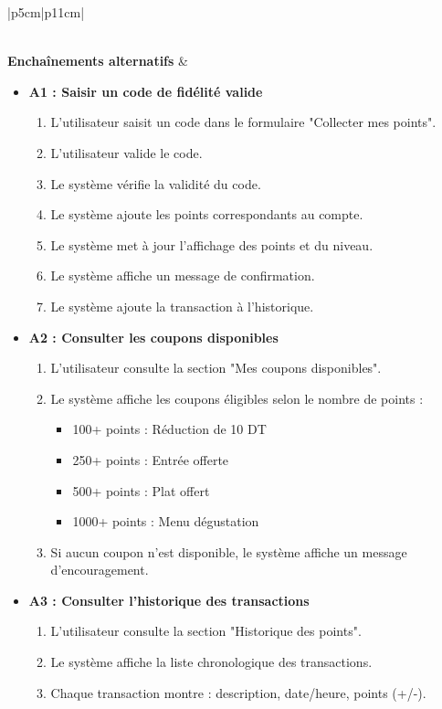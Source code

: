 \begin{longtable}{|p{5cm}|p{11cm}|}
\begin{minipage}{\linewidth}
\end{minipage} \\ 
\hline
\textbf{Enchaînements alternatifs} &
\begin{minipage}{\linewidth}
\begin{itemize}
\setlength{\itemsep}{3pt}
\item \textbf{A1 : Saisir un code de fidélité valide}
\begin{enumerate}
\item L'utilisateur saisit un code dans le formulaire "Collecter mes points".
\item L'utilisateur valide le code.
\item Le système vérifie la validité du code.
\item Le système ajoute les points correspondants au compte.
\item Le système met à jour l'affichage des points et du niveau.
\item Le système affiche un message de confirmation.
\item Le système ajoute la transaction à l'historique.
\end{enumerate}
\item \textbf{A2 : Consulter les coupons disponibles}
\begin{enumerate}
\item L'utilisateur consulte la section "Mes coupons disponibles".
\item Le système affiche les coupons éligibles selon le nombre de points :
  \begin{itemize}
  \item 100+ points : Réduction de 10 DT
  \item 250+ points : Entrée offerte
  \item 500+ points : Plat offert
  \item 1000+ points : Menu dégustation
  \end{itemize}
\item Si aucun coupon n'est disponible, le système affiche un message d'encouragement.
\end{enumerate}
\item \textbf{A3 : Consulter l'historique des transactions}
\begin{enumerate}
\item L'utilisateur consulte la section "Historique des points".
\item Le système affiche la liste chronologique des transactions.
\item Chaque transaction montre : description, date/heure, points (+/-).

\end{enumerate}
\end{itemize}
\end{minipage}
\end{longtable}
